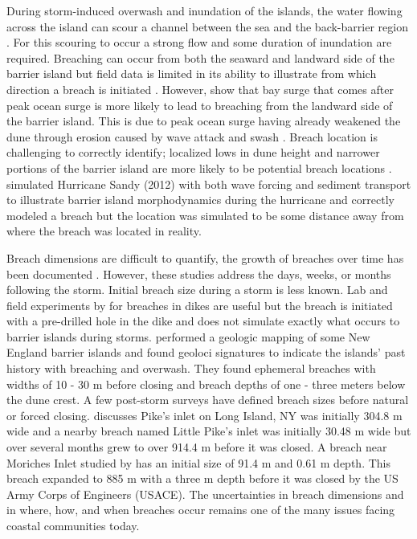 \documentclass{coastal_paper}
\begin{document}
During storm-induced overwash and inundation of the islands, the water flowing across the island can scour a channel between the sea and the back-barrier region \citep{Kraus2003, Pierce1970, Roelvink2009}. For this scouring to occur a strong flow and some duration of inundation are required. Breaching can occur from both the seaward and landward side of the barrier island but field data is limited in its ability to illustrate from which direction a breach is initiated \citep{Kraus2003, Pierce1970, Smallegan2017}. However, \citet{Smallegan2017} show that bay surge that comes after peak ocean surge is more likely to lead to breaching from the landward side of the barrier island. This is due to peak ocean surge having already weakened the dune through erosion caused by wave attack and swash \citep{Kraus2003, Smallegan2017}. Breach location is challenging to correctly identify; localized lows in dune height and narrower portions of the barrier island are more likely to be potential breach locations \citep{Kraus2003, Kraus2003a}. \citet{Vander2019} simulated Hurricane Sandy (2012) with both wave forcing and sediment transport to illustrate barrier island morphodynamics during the hurricane and correctly modeled a breach but the location was simulated to be some distance away from where the breach was located in reality. 

Breach dimensions are difficult to quantify, the growth of breaches over time has been documented \citep{Kraus2003a, Schmeltz1983Breach/InletInlet.}. However, these studies address the days, weeks, or months following the storm. Initial breach size during a storm is less known. Lab and field experiments by \citet{Visser1999} for breaches in dikes are useful but the breach is initiated with a pre-drilled hole in the dike and does not simulate exactly what occurs to barrier islands during storms. \citet{Buynevich2006} performed a geologic mapping of some New England barrier islands and found geoloci signatures to indicate the islands' past history with breaching and overwash. They found ephemeral breaches with widths of 10 - 30 m before closing and breach depths of one - three meters below the dune crest. A few post-storm surveys have defined breach sizes before natural or forced closing. \cite{Kraus2003a} discusses Pike's inlet on Long Island, NY was initially 304.8 m wide and a nearby breach named Little Pike's inlet was initially 30.48 m wide but over several months grew to over 914.4 m before it was closed. A breach near Moriches Inlet studied by \cite{Schmeltz1983Breach/InletInlet.} has an initial size of 91.4 m and 0.61 m depth. This breach expanded to 885 m with a three m depth before it was closed by the US Army Corps of Engineers (USACE). The uncertainties in breach dimensions and  in where, how, and when breaches occur remains one of the many issues facing coastal communities today.
\end{document}
